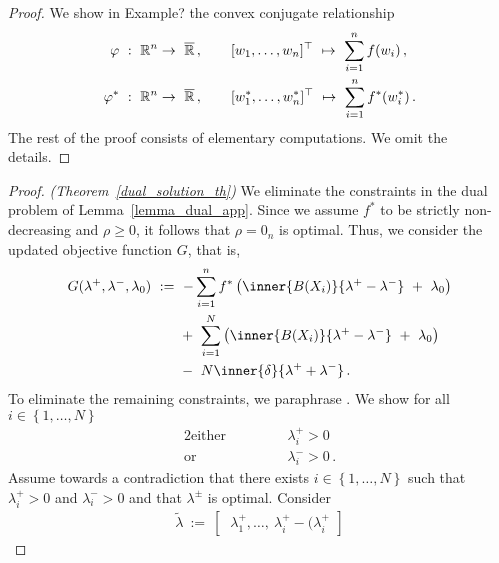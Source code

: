 \begin{proof}
  We show in Example? the convex conjugate relationship
\begin{align*}
  \varphi
  &
  \ 
  :
  \ 
  \R^n
  \to
  \ 
  \overline{\R}
  \,
  ,
  \qquad
  [w_1,\ldots,w_n]^\top
  \ 
  \mapsto
  \ 
  \sum_{i=1}^n f(w_i)
  \,,
  \\
  \varphi^*
  &
  \ 
  :
  \ 
  \R^n
  \to
  \ 
  \overline{\R}
  \,
  ,
  \qquad
  [w^*_1,\ldots,w^*_n]^\top
  \ 
  \mapsto
  \ 
  \sum_{i=1}^n f^*(w^*_i)
  \,.
\end{align*}
  The rest of the proof consists of elementary computations. We omit the details.
\end{proof}
\begin{proof}\emph{(Theorem~\ref{dual_solution_th})}
  We eliminate the constraints in the dual problem of 
  Lemma~\ref{lemma_dual_app}.
  Since we assume $f^*$ to be strictly non-decreasing and $\rho\ge0$, it follows that $\rho=\mathrm{0}_n$ is optimal.
  Thus, we consider the updated objective function $G$, that is,
\begin{align*}
  G(\lambda^+,\lambda^-,\lambda_0)
  &
  \ 
  :=
  \ 
    -
    \sum_{i=1}^{n} 
    f^*
    \left( 
      \inner{B(X_i)}{\lambda^+-\lambda^-}
      \ 
      +
      \ 
      \lambda_0
    \right)
    \\
    &
    \qquad 
    +
    \ 
    \sum_{i=1}^{N} 
    \left( 
      \inner{B(X_i)}{\lambda^+-\lambda^-}
      \ 
      +
      \ 
      \lambda_0
    \right)
    \\
    &
    \qquad 
    -
    \ 
    N
    \inner{\delta}{\lambda^++\lambda^-}
    \,.
\end{align*}
  To eliminate the remaining constraints, 
  we paraphrase \cite[pages~19-20]{Wang2019}.
  We show 
  for all $i \in \left\{ 1,\ldots,N \right\}$
\begin{alignat*}{2}
  \text{either}
  &
  &&
  \qquad
      \lambda_i^+ > 0
  \\
  \text{or}
  &
  &&
  \qquad
      \lambda_i^- > 0
  \,.
\end{alignat*}
Assume towards a contradiction that 
there exists
$i \in \left\{ 1,\ldots,N \right\}$
such that
$
      \lambda_i^+ > 0
$
and
$
      \lambda_i^- > 0
$ 
and that 
$\lambda^\pm$ is optimal.
Consider
  \begin{gather}
    \tilde{\lambda}
    \ 
    :=
    \ 
    \begin{bmatrix}
      \ 
      \lambda_1^+,
      \ldots,
      \ 
      \lambda_i^+
      \!
      -
      (
      \lambda_i^+

\end{bmatrix}
\end{gather}
\end{proof}
